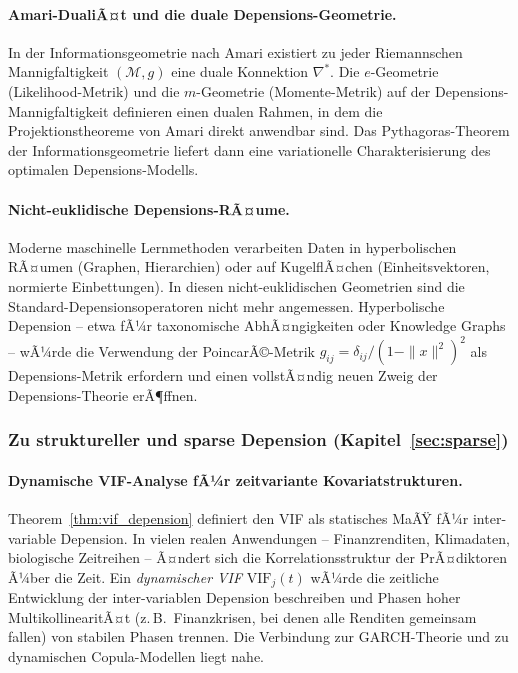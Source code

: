 ﻿\documentclass[12pt, a4paper]{article}
\theoremstyle{definition}
\theoremstyle{remark}
\newcommand{\VIF}{\mathrm{VIF}}
\begin{document}
\paragraph{Amari-DualiÃ¤t und die duale Depensions-Geometrie.}
In der Informationsgeometrie nach Amari existiert zu jeder Riemannschen
Mannigfaltigkeit $({\mathcal{M}}, g)$ eine duale Konnektion $\nabla^*$.
Die $e$-Geometrie (Likelihood-Metrik) und die $m$-Geometrie (Momente-Metrik)
auf der Depensions-Mannigfaltigkeit definieren einen dualen Rahmen, in dem die
Projektionstheoreme von Amari direkt anwendbar sind. Das Pythagoras-Theorem der
Informationsgeometrie liefert dann eine variationelle Charakterisierung des
optimalen Depensions-Modells.

\paragraph{Nicht-euklidische Depensions-RÃ¤ume.}
Moderne maschinelle Lernmethoden verarbeiten Daten in hyperbolischen RÃ¤umen
(Graphen, Hierarchien) oder auf KugelflÃ¤chen (Einheitsvektoren, normierte Einbettungen).
In diesen nicht-euklidischen Geometrien sind die Standard-Depensionsoperatoren
nicht mehr angemessen. Hyperbolische Depension -- etwa fÃ¼r taxonomische AbhÃ¤ngigkeiten
oder Knowledge Graphs -- wÃ¼rde die Verwendung der PoincarÃ©-Metrik
$g_{ij} = \delta_{ij}/(1-\|x\|^2)^2$ als Depensions-Metrik erfordern und einen
vollstÃ¤ndig neuen Zweig der Depensions-Theorie erÃ¶ffnen.

\subsubsection{Zu struktureller und sparse Depension (Kapitel~\ref{sec:sparse})}

\paragraph{Dynamische VIF-Analyse fÃ¼r zeitvariante Kovariatstrukturen.}
Theorem~\ref{thm:vif_depension} definiert den VIF als statisches MaÃŸ fÃ¼r
inter-variable Depension. In vielen realen Anwendungen -- Finanzrenditen, Klimadaten,
biologische Zeitreihen -- Ã¤ndert sich die Korrelationsstruktur der PrÃ¤diktoren Ã¼ber
die Zeit. Ein \emph{dynamischer VIF} $\VIF_j(t)$ wÃ¼rde die zeitliche Entwicklung der
inter-variablen Depension beschreiben und Phasen hoher MultikollinearitÃ¤t (z.\,B.\
Finanzkrisen, bei denen alle Renditen gemeinsam fallen) von stabilen Phasen trennen.
Die Verbindung zur GARCH-Theorie und zu dynamischen Copula-Modellen liegt nahe.
\end{document}
